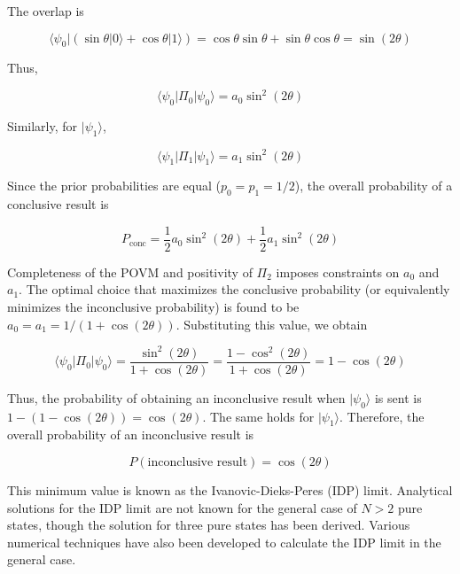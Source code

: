 The overlap is

\begin{equation}
    \langle\psi_0|(\sin\theta |0\rangle + \cos\theta |1\rangle) = \cos\theta\sin\theta + \sin\theta\cos\theta = \sin(2\theta)
\end{equation}

Thus,

\begin{equation}
    \langle\psi_0|\Pi_0|\psi_0\rangle = a_0 \sin^2(2\theta)
\end{equation}

Similarly, for $|\psi_1\rangle$,

\begin{equation}
    \langle\psi_1|\Pi_1|\psi_1\rangle = a_1 \sin^2(2\theta)
\end{equation}

Since the prior probabilities are equal ($p_0 = p_1 = 1/2$), the overall probability of a conclusive result is

\begin{equation}
    P_{\text{conc}} = \frac{1}{2} a_0 \sin^2(2\theta) + \frac{1}{2} a_1 \sin^2(2\theta)
\end{equation}

Completeness of the POVM and positivity of $\Pi_2$ imposes constraints on $a_0$ and $a_1$. The optimal choice that maximizes the conclusive probability (or equivalently minimizes the inconclusive probability) is found to be $a_0 = a_1 = 1/(1 + \cos(2\theta))$. Substituting this value, we obtain

\begin{equation}
    \langle\psi_0|\Pi_0|\psi_0\rangle = \frac{\sin^2(2\theta)}{1 + \cos(2\theta)} = \frac{1 - \cos^2(2\theta)}{1 + \cos(2\theta)} = 1 - \cos(2\theta)
\end{equation}

Thus, the probability of obtaining an inconclusive result when $|\psi_0\rangle$ is sent is $1 - (1 - \cos(2\theta)) = \cos(2\theta)$. The same holds for $|\psi_1\rangle$. Therefore, the overall probability of an inconclusive result is

\begin{equation}
    P(\text{inconclusive result}) = \cos(2\theta)
\end{equation}

This minimum value is known as the Ivanovic-Dieks-Peres (IDP) limit. Analytical solutions for the IDP limit are not known for the general case of $N > 2$ pure states, though the solution for three pure states has been derived. Various numerical techniques have also been developed to calculate the IDP limit in the general case.

